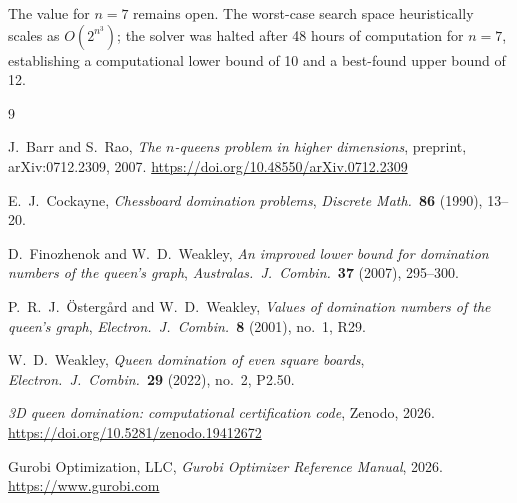 \documentclass[11pt]{article}
\begin{document}
The value for $n = 7$ remains open. The worst-case search space heuristically scales as $O(2^{n^3})$; the solver was halted after 48 hours of computation for $n = 7$, establishing a computational lower bound of 10 and a best-found upper bound of 12.

\begin{thebibliography}{9}

J.~Barr and S.~Rao,
\textit{The $n$-queens problem in higher dimensions},
preprint, arXiv:0712.2309, 2007.
\url{https://doi.org/10.48550/arXiv.0712.2309}

E.~J.~Cockayne,
\textit{Chessboard domination problems},
\textit{Discrete Math.}\ \textbf{86} (1990), 13--20.

D.~Finozhenok and W.~D.~Weakley,
\textit{An improved lower bound for domination numbers of the queen's graph},
\textit{Australas.\ J.\ Combin.}\ \textbf{37} (2007), 295--300.

P.~R.~J.~\"{O}sterg\r{a}rd and W.~D.~Weakley,
\textit{Values of domination numbers of the queen's graph},
\textit{Electron.\ J.\ Combin.}\ \textbf{8} (2001), no.~1, R29.

W.~D.~Weakley,
\textit{Queen domination of even square boards},
\textit{Electron.\ J.\ Combin.}\ \textbf{29} (2022), no.~2, P2.50.

\textit{3D queen domination: computational certification code},
Zenodo, 2026.
\url{https://doi.org/10.5281/zenodo.19412672}

Gurobi Optimization, LLC,
\textit{Gurobi Optimizer Reference Manual},
2026.
\url{https://www.gurobi.com}

\end{thebibliography}
\end{document}
